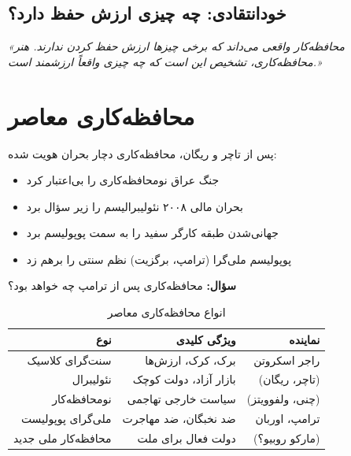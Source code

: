 \subsection{خودانتقادی: چه چیزی ارزش حفظ دارد؟}

\begin{quotebox}
\textit{«محافظه‌کار واقعی می‌داند که برخی چیزها ارزش حفظ کردن ندارند. هنر محافظه‌کاری، تشخیص این است که چه چیزی واقعاً ارزشمند است.»}
\end{quotebox}

\section{محافظه‌کاری معاصر}

\begin{historybox}
پس از تاچر و ریگان، محافظه‌کاری دچار بحران هویت شده:
\begin{itemize}[nosep]
    \item جنگ عراق نومحافظه‌کاری را بی‌اعتبار کرد
    \item بحران مالی ۲۰۰۸ نئولیبرالیسم را زیر سؤال برد
    \item جهانی‌شدن طبقه کارگر سفید را به سمت پوپولیسم برد
    \item پوپولیسم ملی‌گرا (ترامپ، برگزیت) نظم سنتی را برهم زد
\end{itemize}

\textbf{سؤال:} محافظه‌کاری پس از ترامپ چه خواهد بود؟
\end{historybox}

\begin{table}[htbp]
\centering
\caption{انواع محافظه‌کاری معاصر}
\label{tab:contemporary-conservatism}
\begin{tabular}{r|r|r}
\toprule
\textbf{نوع} & \textbf{ویژگی کلیدی} & \textbf{نماینده} \\
\midrule
سنت‌گرای کلاسیک & برک، کرک، ارزش‌ها & راجر اسکروتن \\
نئولیبرال & بازار آزاد، دولت کوچک & (تاچر، ریگان) \\
نومحافظه‌کار & سیاست خارجی تهاجمی & (چنی، ولفوویتز) \\
ملی‌گرای پوپولیست & ضد نخبگان، ضد مهاجرت & ترامپ، اوربان \\
محافظه‌کار ملی جدید & دولت فعال برای ملت & (مارکو روبیو؟) \\
\bottomrule
\end{tabular}
\end{table}

